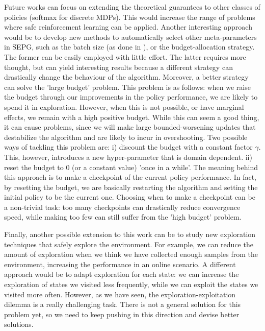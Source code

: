 Future works can focus on extending the theoretical guarantees to other classes of policies (\eg softmax for discrete MDPs). This would increase the range of problems where safe reinforcement learning can be applied. Another interesting approach would be to develop new methods to automatically select other meta-parameters in SEPG, such as the batch size (as done in \cite{adaptive_batch}), or the budget-allocation strategy. The former can be easily employed with little effort. The latter requires more thought, but can yield interesting results because a different strategy can drastically change the behaviour of the algorithm. 
Moreover, a better strategy can solve the 'large budget' problem. This problem is as follows: 
when we raise the budget through our improvements in the policy performance, we are likely to spend it in exploration. However, when this is not possible, or have marginal effects, we remain with a high positive budget. While this can seem a good thing, it can cause problems, since we will make large bounded-worsening updates that destabilize the algorithm and are likely to incur in overshooting.
Two possible ways of tackling this problem are: i) discount the budget with a constant factor $\gamma$. This, however, introduces a new hyper-parameter that is domain dependent. ii) reset the budget to 0 (or a constant value) 'once in a while'. The meaning behind this approach is to make a checkpoint of the current policy performance. In fact, by resetting the budget, we are basically restarting the algorithm and setting the initial policy to be the current one. Choosing when to make a checkpoint can be a non-trivial task: too many checkpoints can drastically reduce convergence speed, while making too few can still suffer from the 'high budget' problem. 


Finally, another possible extension to this work can be to study new exploration techniques that safely explore the environment. For example, we can reduce the amount of exploration when we think we have collected enough samples from the environment, increasing the performance in an online scenario. A different approach would be to adapt exploration for each state: we can increase the exploration of states we visited less frequently, while we can exploit the states we visited more often. However, as we have seen, the exploration-exploitation dilemma is a really challenging task. There is not a general solution for this problem yet, so we need to keep pushing in this direction and devise better solutions.
